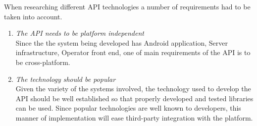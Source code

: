\documentclass{article}
\begin{document}
When researching different API technologies a number of requirements had to be taken into account.
\begin{enumerate}
\item \textit{The API needs to be platform independent}\\
Since the the system being developed has Android application, Server infrastructure, Operator front end, one of main requirements of the API is to be cross-platform.

\item \textit{The technology should be popular}\\
Given the variety of the systems involved, the technology used to develop the API should be well established so that properly developed and tested libraries can be used.
Since popular technologies are well known to developers, this manner of implementation will ease third-party integration with the platform.
\end{enumerate}
\end{document}

